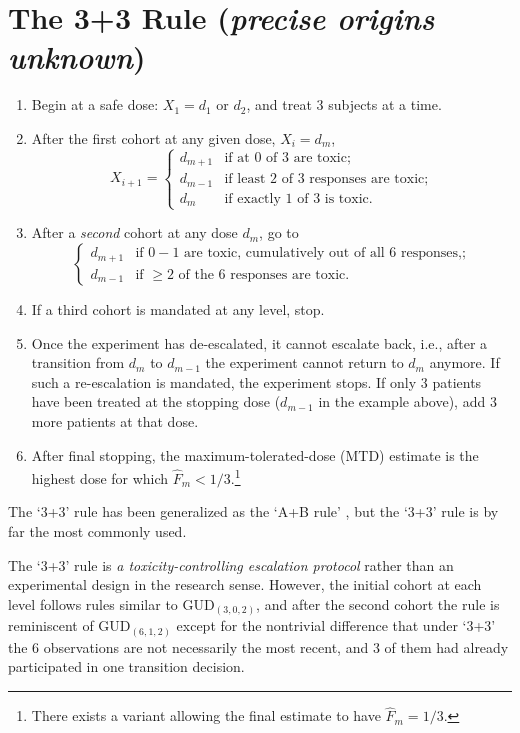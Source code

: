 \section{The 3+3 Rule (\emph{precise origins unknown})}
%
\begin{enumerate}
\item Begin at a safe dose: $X_1=d_1$ or $d_2$, and treat 3 subjects at a time.
\item After the first cohort at any given dose, $X_i=d_m$,
\begin{equation*}
X_{i+1}=
\begin{cases}
    d_{m+1} &\textrm{if at $0$ of $3$ are toxic;}\\
    d_{m-1} &\textrm{if least $2$ of $3$ responses are toxic;} \\
    d_m &\textrm{if exactly $1$ of $3$ is toxic.}
\end{cases}
\end{equation*}
\item After a \emph{second} cohort at any dose $d_m$, go to
\begin{equation*}
\begin{cases}
    d_{m+1} &\textrm{if $0-1$ are toxic, cumulatively out of all $6$ responses,;}\\
    d_{m-1} &\textrm{if $\geq 2$ of the $6$ responses are toxic.}
\end{cases}
\end{equation*}
\item If a third cohort is mandated at any level, stop.
\item Once the experiment has de-escalated, it cannot escalate back, i.e., after a transition from $d_m$ to $d_{m-1}$ the experiment cannot return to $d_m$ anymore. If such a re-escalation is mandated, the experiment stops. If only $3$ patients have been treated at the stopping dose ($d_{m-1}$ in the example above), add $3$ more patients at that dose.
\item After final stopping, the maximum-tolerated-dose (MTD) estimate is the highest dose for which $\hat{F}_m<1/3$.\footnote{There exists a variant allowing the final estimate to have $\hat{F}_m=1/3$.}
\end{enumerate}
%
\noindent The `3+3' rule has been generalized as the `A+B rule' \citep{Lin:Shih:stat:2001}, but the `3+3' rule is by far the most commonly used.

The `3+3' rule is \emph{a toxicity-controlling escalation protocol} rather than an experimental design in the research sense. However, the initial cohort at each level follows rules similar to GUD$_{(3,0,2)}$, and after the second cohort the rule is reminiscent of GUD$_{(6,1,2)}$  except for the nontrivial difference that under `3+3' the 6 observations are not necessarily the most recent, and 3 of them had already participated in one transition decision.


